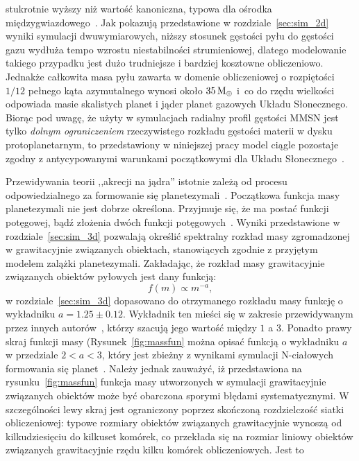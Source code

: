 stukrotnie wyższy niż wartość kanoniczna, typowa dla ośrodka
międzygwiazdowego~\cite{FS03}. Jak pokazują przedstawione w rozdziale~\ref{sec:sim_2d}
wyniki symulacji dwuwymiarowych, niższy stosunek gęstości pyłu do gęstości gazu
wydłuża tempo wzrostu niestabilności strumieniowej, dlatego modelowanie
takiego przypadku jest  dużo trudniejsze i bardziej kosztowne
obliczeniowo.  Jednakże całkowita masa pyłu zawarta w domenie obliczeniowej o
rozpiętości $1/12$ pełnego kąta azymutalnego wynosi około $35\hbox{$\mathrm{\thinspace M_{\oplus}}$}$ i~co do rzędu
wielkości odpowiada masie skalistych planet i jąder planet gazowych Układu
Słonecznego. Biorąc pod uwagę, że użyty w symulacjach radialny profil gęstości
MMSN jest tylko \emph{dolnym ograniczeniem} rzeczywistego rozkładu gęstości
materii w dysku protoplanetarnym, to przedstawiony w niniejszej pracy model
ciągle pozostaje zgodny z antycypowanymi warunkami początkowymi dla Układu
Słonecznego~\cite{D07}.
\par Przewidywania teorii ,,akrecji na jądra'' istotnie zależą od procesu
odpowiedzialnego za formowanie się planetezymali~\cite{HBP13}. Początkowa
funkcja masy planetezymali nie jest dobrze określona. Przyjmuje się, że ma
postać funkcji potęgowej, bądź złożenia dwóch funkcji potęgowych~\cite{R03}.
Wyniki przedstawione w rozdziale~\ref{sec:sim_3d} pozwalają określić spektralny
rozkład masy zgromadzonej w grawitacyjnie związanych obiektach, stanowiących
zgodnie z przyjętym modelem zalążki planetezymali.  Zakładając, że rozkład masy
grawitacyjnie związanych obiektów pyłowych jest dany funkcją:
%
\begin{equation}
   f(m) \propto m^{-a},
\end{equation}
%
w rozdziale~\ref{sec:sim_3d} dopasowano do otrzymanego rozkładu masy funkcję o
wykładniku $a = 1.25\pm0.12$. Wykładnik ten mieści się w zakresie przewidywanym
przez innych
autorów~\cite{R03}, którzy szacują jego wartość między $1$ a $3$. Ponadto prawy
skraj funkcji masy (Rysunek~\ref{fig:massfun} można opisać funkcją o wykładniku
$a$ w przedziale $2 < a < 3$, który jest zbieżny z wynikami symulacji N-ciałowych
formowania się planet~\cite{MFFK98}.  Należy jednak zauważyć, iż przedstawiona
na rysunku~\ref{fig:massfun} funkcja masy utworzonych w symulacji grawitacyjnie
związanych obiektów może być obarczona sporymi błędami systematycznymi.
W szczególności lewy skraj jest ograniczony poprzez skończoną rozdzielczość
siatki obliczeniowej: typowe rozmiary obiektów związanych grawitacyjnie wynoszą
od kilkudziesięciu do kilkuset komórek, co przekłada się na rozmiar liniowy
obiektów związanych grawitacyjnie rzędu kilku komórek obliczeniowych. Jest to
